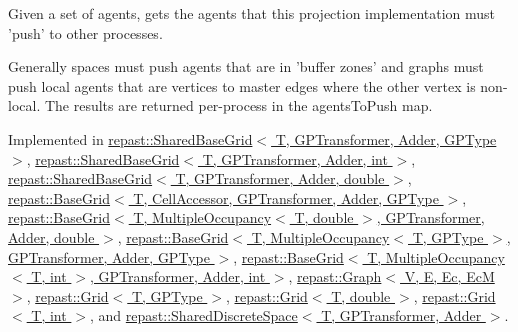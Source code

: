 Given a set of agents, gets the agents that this projection implementation must 'push' to other processes. 

Generally spaces must push agents that are in 'buffer zones' and graphs must push local agents that are vertices to master edges where the other vertex is non-\/ local. The results are returned per-\/process in the agents\-To\-Push map. 

Implemented in \hyperlink{classrepast_1_1_shared_base_grid_ab1486e7698288efc1218653d4e5e1e15}{repast\-::\-Shared\-Base\-Grid$<$ T, G\-P\-Transformer, Adder, G\-P\-Type $>$}, \hyperlink{classrepast_1_1_shared_base_grid_ab1486e7698288efc1218653d4e5e1e15}{repast\-::\-Shared\-Base\-Grid$<$ T, G\-P\-Transformer, Adder, int $>$}, \hyperlink{classrepast_1_1_shared_base_grid_ab1486e7698288efc1218653d4e5e1e15}{repast\-::\-Shared\-Base\-Grid$<$ T, G\-P\-Transformer, Adder, double $>$}, \hyperlink{classrepast_1_1_base_grid_a8f718ade5af8285f71151eea824ce3cd}{repast\-::\-Base\-Grid$<$ T, Cell\-Accessor, G\-P\-Transformer, Adder, G\-P\-Type $>$}, \hyperlink{classrepast_1_1_base_grid_a8f718ade5af8285f71151eea824ce3cd}{repast\-::\-Base\-Grid$<$ T, Multiple\-Occupancy$<$ T, double $>$, G\-P\-Transformer, Adder, double $>$}, \hyperlink{classrepast_1_1_base_grid_a8f718ade5af8285f71151eea824ce3cd}{repast\-::\-Base\-Grid$<$ T, Multiple\-Occupancy$<$ T, G\-P\-Type $>$, G\-P\-Transformer, Adder, G\-P\-Type $>$}, \hyperlink{classrepast_1_1_base_grid_a8f718ade5af8285f71151eea824ce3cd}{repast\-::\-Base\-Grid$<$ T, Multiple\-Occupancy$<$ T, int $>$, G\-P\-Transformer, Adder, int $>$}, \hyperlink{classrepast_1_1_graph_a011c1f0f065e5b8238c6783966c380eb}{repast\-::\-Graph$<$ V, E, Ec, Ec\-M $>$}, \hyperlink{classrepast_1_1_grid_aa83b294fc8765e2f8ee44d8238855460}{repast\-::\-Grid$<$ T, G\-P\-Type $>$}, \hyperlink{classrepast_1_1_grid_aa83b294fc8765e2f8ee44d8238855460}{repast\-::\-Grid$<$ T, double $>$}, \hyperlink{classrepast_1_1_grid_aa83b294fc8765e2f8ee44d8238855460}{repast\-::\-Grid$<$ T, int $>$}, and \hyperlink{classrepast_1_1_shared_discrete_space_a1f690e82e6b7ea6a279db020e12b4d21}{repast\-::\-Shared\-Discrete\-Space$<$ T, G\-P\-Transformer, Adder $>$}.

